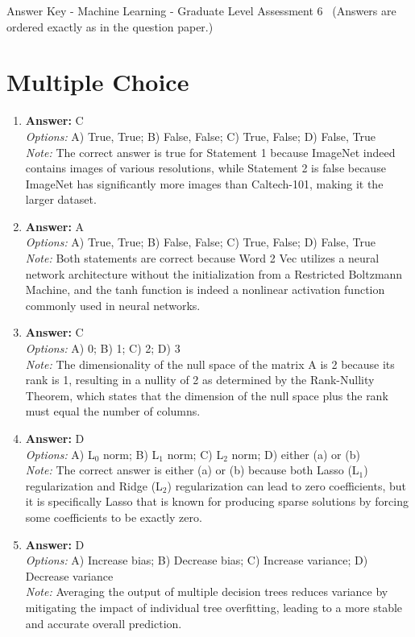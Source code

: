\documentclass[12pt]{article}
\begin{document}
\begin{center}
Answer Key - Machine Learning - Graduate Level Assessment 6 \
\small (Answers are ordered exactly as in the question paper.)
\end{center}

\section*{Multiple Choice}
\begin{enumerate}[label=\arabic*.]
\item \textbf{Answer:} C
\\ \textit{Options:} A) True, True; B) False, False; C) True, False; D) False, True
\\ \textit{Note:} The correct answer is true for Statement 1 because ImageNet indeed contains images of various resolutions, while Statement 2 is false because ImageNet has significantly more images than Caltech-101, making it the larger dataset.
\item \textbf{Answer:} A
\\ \textit{Options:} A) True, True; B) False, False; C) True, False; D) False, True
\\ \textit{Note:} Both statements are correct because Word 2 Vec utilizes a neural network architecture without the initialization from a Restricted Boltzmann Machine, and the tanh function is indeed a nonlinear activation function commonly used in neural networks.
\item \textbf{Answer:} C
\\ \textit{Options:} A) 0; B) 1; C) 2; D) 3
\\ \textit{Note:} The dimensionality of the null space of the matrix A is 2 because its rank is 1, resulting in a nullity of 2 as determined by the Rank-Nullity Theorem, which states that the dimension of the null space plus the rank must equal the number of columns.
\item \textbf{Answer:} D
\\ \textit{Options:} A) L$_{0}$ norm; B) L$_{1}$ norm; C) L$_{2}$ norm; D) either (a) or (b)
\\ \textit{Note:} The correct answer is either (a) or (b) because both Lasso (L$_{1}$) regularization and Ridge (L$_{2}$) regularization can lead to zero coefficients, but it is specifically Lasso that is known for producing sparse solutions by forcing some coefficients to be exactly zero.
\item \textbf{Answer:} D
\\ \textit{Options:} A) Increase bias; B) Decrease bias; C) Increase variance; D) Decrease variance
\\ \textit{Note:} Averaging the output of multiple decision trees reduces variance by mitigating the impact of individual tree overfitting, leading to a more stable and accurate overall prediction.
\end{enumerate}
\end{document}
